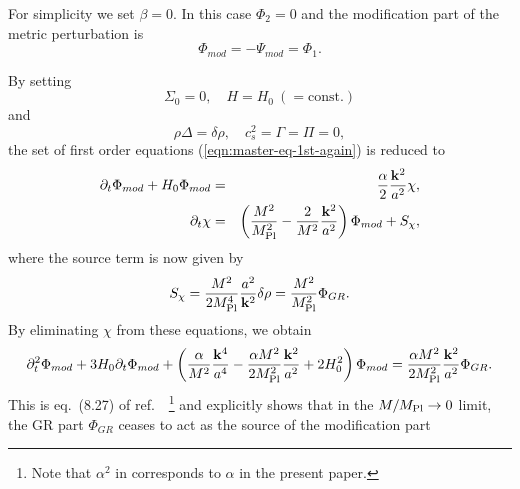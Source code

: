 For simplicity we set $\beta=0$. In this case $\Phi_2=0$ and the
modification part of the metric perturbation is 
%
\begin{equation}
 \Phi_{mod} = -\Psi_{mod} = \Phi_1. 
\end{equation}


By setting 
%
\begin{equation}
 \Sigma_0 = 0, \quad H=H_0 \ (= \mbox{const.})
\end{equation}
and 
%
\begin{equation}
 \rho\Delta = \delta\rho, \quad
  c_s^2=\Gamma=\Pi = 0,
\end{equation}
the set of first order equations (\ref{eqn:master-eq-1st-again}) is
reduced to 
%
\begin{eqnarray}
 \partial_t\Phi_{mod} +H_0\Phi_{mod} & = & 
  \frac{\alpha}{2}\frac{{\bf k}^2}{a^2}\chi, \nonumber\\
 \partial_t\chi & = & 
  \left(\frac{M^2}{M_{\rm Pl}^2}
   -\frac{2}{M^2}\frac{{\bf k}^2}{a^2}\right)\Phi_{mod} + S_{\chi}, 
\end{eqnarray}
where the source term is now given by 
%
\begin{equation}
 S_{\chi} = 
  \frac{M^2}{2M_{\rm Pl}^4}\frac{a^2}{{\bf k}^2}\delta\rho
  =  \frac{M^2}{M_{\rm Pl}^2}\Phi_{GR}.
\end{equation}
By eliminating $\chi$ from these equations, we obtain
%
\begin{equation}
 \partial_t^2\Phi_{mod} +3H_0\partial_t\Phi_{mod}
  + \left(\frac{\alpha}{M^2}\frac{{\bf k}^4}{a^4}
     - \frac{\alpha M^2}{2M_{\rm Pl}^2}\frac{{\bf k}^2}{a^2}
     + 2H_0^2 \right)\Phi_{mod}
  = \frac{\alpha M^2}{2M_{\rm Pl}^2}\frac{{\bf k}^2}{a^2}\Phi_{GR}.
\end{equation}
This is eq.~(8.27) of ref.~\cite{Arkani-Hamed:2003uy}~\footnote{
Note that $\alpha^2$ in \cite{Arkani-Hamed:2003uy} corresponds to
$\alpha$ in the present paper.} 
and explicitly shows that in the $M/M_{\rm Pl}\to 0$ limit, the GR part
$\Phi_{GR}$ ceases to act as the source of the modification part
